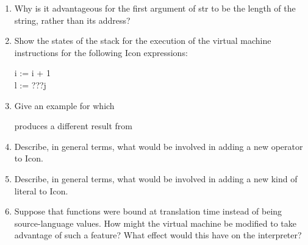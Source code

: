 \liststyleLvi
\begin{enumerate}
\item Why is it advantageous for the first argument of str to be the
length of the string, rather than its address?

\item Show the states of the stack for the execution of the virtual
machine instructions for the following Icon expressions:

\begin{iconcode}
\>   i := i + 1 \\
\>   l := ???j
\end{iconcode}

\item Give an example for which


produces a different result from


\item Describe, in general terms, what would be involved in adding a
new operator to Icon.

\item Describe, in general terms, what would be involved in adding a
new kind of literal to Icon.

\item Suppose that functions were bound at translation time instead of
being source-language values. How might the virtual machine be
modified to take advantage of such a feature?  What effect would this
have on the interpreter?

\end{enumerate}
